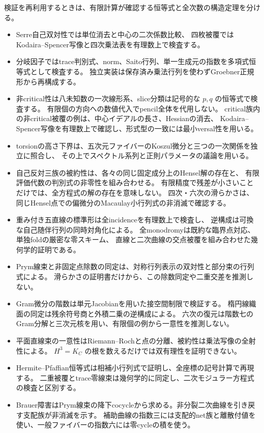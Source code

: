 検証を再利用するときは、有限計算が確認する恒等式と全次数の構造定理を分ける。
\begin{itemize}
\item Serre自己双対性では単位消去と中心の二次係数比較、
四枚被覆ではKodaira--Spencer写像と四次乗法表を有理数上で検査する。
\item 分岐因子ではtrace判別式、norm、Saito行列、単一生成元の指数を多項式恒等式として検査する。
独立実装は保存済み乗法行列を使わずGroebner正規形から再構成する。
\item 非critical性は八未知数の一次線形系、slice分類は記号的な $p,q$ の恒等式で検査する。
有限個の方向への数値代入でpencil全体を代用しない。
critical族内の非critical被覆の例は、中心イデアルの長さ、Hessianの消去、
Kodaira--Spencer写像を有理数上で確認し、形式型の一致には最小versal性を用いる。
\item torsionの高さ下界は、五次元ファイバーのKoszul微分と三つの一次関係を独立に照合し、
その上でスペクトル系列と正則パラメータの議論を用いる。
\item 自己反対三族の被約性は、各々の同じ固定成分上のHensel解の存在と、
有限評価代数の判別式の非零性を組み合わせる。
有限精度で残差が小さいことだけでは、全方程式の解の存在を意味しない。
四次・六次の滑らかさは、同じHensel点での偏微分のMacaulay小行列式の非消滅で確認する。
\item 重み付き五直線の標準形は全incidenceを有理数上で検査し、
逆構成は可換な自己随伴行列の同時対角化による。
全monodromyは既約な臨界点対応、単独foldの厳密な零スキーム、
直線と二次曲線の交点被覆を組み合わせた幾何学的証明である。
\item Prym線束と非固定点除数の同定は、対称行列表示の双対性と部分束の行列式による。
滑らかさの証明書だけから、この除数同定や二重交差を推測しない。
\item Gram微分の階数は単元Jacobianを用いた接空間制限で検証する。
楕円線織面の同定は残余符号商と外積二乗の逆構成による。
六次の復元は階数七のGram分解と三次元核を用い、有限個の例から一意性を推測しない。
\item 平面直線束の一意性はRiemann--Rochと点の分離、被約性は乗法写像の全射性による。
$H^3=K_C$ の根を数えるだけでは双有理性を証明できない。
\item Hermite--Pfaffian恒等式は相補小行列式で証明し、全座標の記号計算で再現する。
二重被覆とtrace零線束は幾何学的に同定し、二次モジュラー方程式の検査と区別する。
\item Brauer障害はPrym線束の降下cocycleから求める。非分裂二次曲線を引き戻す支配族が非消滅を示す。
補助曲線の指数三には支配的net族と離散付値を使い、一般ファイバーの指数六には零cycleの積を使う。

\end{itemize}

